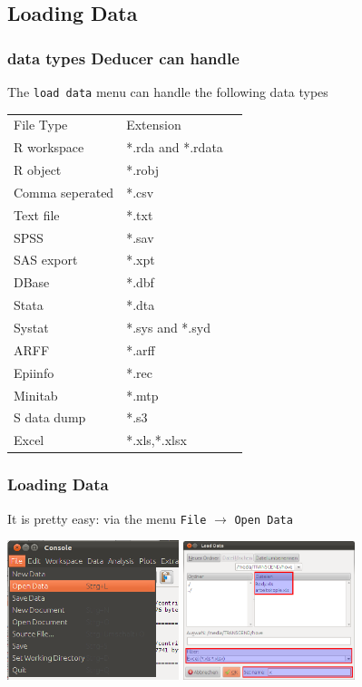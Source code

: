 \documentclass[xcolor={table}]{beamer}
\begin{document}
\subsection{Loading Data}
\begin{frame}[shrink=5]\frametitle{data types Deducer can handle}
  The \texttt{load data} menu can handle the following data types
\begin{center}
  \begin{tabular}{@{} >{\ttfamily}l l l} 
    \rowcolor{gray!40}
    File Type&Extension\\
    R workspace&*.rda and *.rdata\\
    R object&*.robj\\
    Comma seperated&*.csv\\
    Text file&*.txt\\
    SPSS&*.sav\\
    SAS export&*.xpt\\
    DBase&*.dbf\\
    Stata&*.dta\\
    Systat&*.sys and *.syd\\
    ARFF&*.arff\\
    Epiinfo&*.rec\\
    Minitab&*.mtp\\
    S data dump&*.s3 \\
    Excel&*.xls,*.xlsx\\
  \end{tabular}
\end{center}
\end{frame}

\begin{frame}\frametitle{Loading Data}
  It is pretty easy: via the menu \texttt{File} $\to$ \texttt{Open Data}
  \begin{center}
    \includegraphics[width=5cm]{loaddata1.png} \hspace*{1cm}\includegraphics[width=5cm]{loaddata2.png}
  \end{center}
\end{frame}
\end{document}
